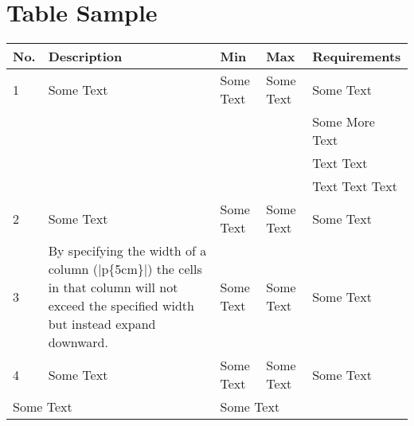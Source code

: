 \section{Table Sample} %
\begin{table}[H]
\begin{tabular}{|l|p{5cm}|l|l|l|}
  \hline %
  \textbf{No.} &\textbf{Description} &\textbf{Min} &\textbf{Max} &\textbf{Requirements}    \\
  \hline %
  1            & Some Text           & Some Text   & Some Text   & Some Text               \\
               &                     &             &             & Some More Text          \\
               &                     &             &             & Text Text               \\
               &                     &             &             & Text Text Text          \\
  \hline %
  2            & Some Text           & Some Text   & Some Text   & Some Text               \\
  \hline %
  3            & By specifying the
                 width of a column
                 (|p\{5cm\}|) the
                 cells in that column
                 will not exceed the
                 specified width but         %
                 instead expand              %
                 downward.
                                     & Some Text           & Some Text   & Some Text       \\
  \hline %
  4            & Some Text           & Some Text   & Some Text   & Some Text               \\
  \hline %
  \multicolumn{2}{|l|}{Some Text}    & \multicolumn{3}{l|}{Some Text}                      \\

\end{tabular}
\end{table}
